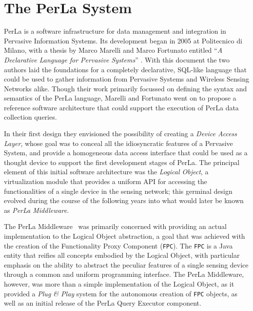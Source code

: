 \chapter{The PerLa System}

PerLa is a software infrastructure for data management and integration in
Pervasive Information Systems. Its development began in 2005 at Politecnico di
Milano, with a thesis by Marco Marelli and Marco Fortunato entitled ``\textit{A
Declarative Language for Pervasive Systems}'' \cite{mm_thesis}. With this
document the two authors laid the foundations for a completely declarative,
SQL-like language that could be used to gather information from Pervasive
Systems and Wireless Sensing Networks alike. Though their work primarily
focussed on defining the syntax and semantics of the PerLa language, Marelli
and Fortunato went on to propose a reference software architecture that could
support the execution of PerLa data collection queries.

In their first design they envisioned the possibility of creating a
\textit{Device Access Layer}, whose goal was to conceal all the idiosyncratic
features of a Pervasive System, and provide a homogeneous data access interface
that could be used as a thought device to support the first development stages
of PerLa. The principal element of this initial software architecture was the
\textit{Logical Object}, a virtualization module that provides a uniform API
for accessing the functionalities of a single device in the sensing network;
this germinal design evolved during the course of the following years
into what would later be known as \textit{PerLa Middleware}. 

The PerLa Middleware~\cite{tse_perla} was primarily concerned with providing an
actual implementation to the Logical Object abstraction, a goal that was
achieved with the creation of the Functionality Proxy Component (\texttt{FPC}).
The \texttt{FPC} is a Java entity that reifies all concepts embodied by the
Logical Object, with particular emphasis on the ability to abstract the
peculiar features of a single sensing device through a common and uniform
programming interface. The PerLa Middleware, however, was more than a simple
implementation of the Logical Object, as it provided a \textit{Plug \& Play}
system for the autonomous creation of \texttt{FPC} objects, as well as an
initial release of the PerLa Query Executor component.

